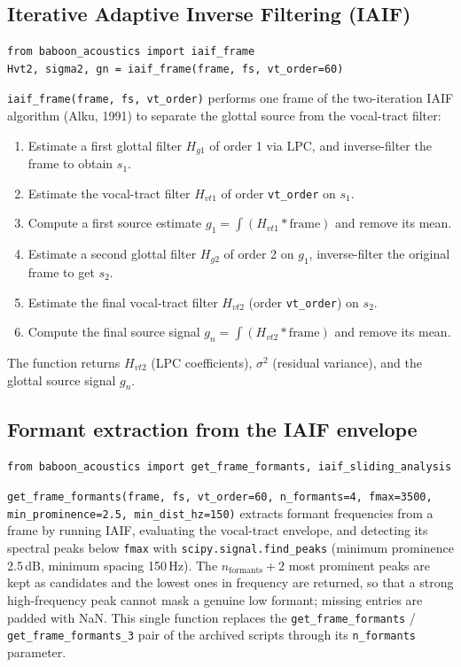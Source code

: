 \documentclass[11pt,a4paper]{article}
\newcommand{\file}[1]{\texttt{#1}}
\begin{document}
\subsection{Iterative Adaptive Inverse Filtering (IAIF)}

\begin{lstlisting}
from baboon_acoustics import iaif_frame
Hvt2, sigma2, gn = iaif_frame(frame, fs, vt_order=60)
\end{lstlisting}
\file{iaif\_frame(frame, fs, vt\_order)} performs one frame of the
two-iteration IAIF algorithm (Alku, 1991) to separate the glottal source
from the vocal-tract filter:
\begin{enumerate}
\item Estimate a first glottal filter $H_{g1}$ of order 1 via LPC, and
      inverse-filter the frame to obtain $s_1$.
\item Estimate the vocal-tract filter $H_{vt1}$ of order
      \file{vt\_order} on $s_1$.
\item Compute a first source estimate
      $g_1 = \int (H_{vt1} * \text{frame})$ and remove its mean.
\item Estimate a second glottal filter $H_{g2}$ of order 2 on $g_1$,
      inverse-filter the original frame to get $s_2$.
\item Estimate the final vocal-tract filter $H_{vt2}$ (order
      \file{vt\_order}) on $s_2$.
\item Compute the final source signal
      $g_n = \int (H_{vt2} * \text{frame})$ and remove its mean.
\end{enumerate}
The function returns $H_{vt2}$ (LPC coefficients), $\sigma^2$ (residual
variance), and the glottal source signal $g_n$.

\subsection{Formant extraction from the IAIF envelope}

\begin{lstlisting}
from baboon_acoustics import get_frame_formants, iaif_sliding_analysis
\end{lstlisting}
\file{get\_frame\_formants(frame, fs, vt\_order=60, n\_formants=4,
fmax=3500, min\_prominence=2.5, min\_dist\_hz=150)} extracts formant
frequencies from a frame by running IAIF, evaluating the vocal-tract
envelope, and detecting its spectral peaks below \file{fmax} with
\file{scipy.signal.find\_peaks} (minimum prominence 2.5\,dB, minimum
spacing 150\,Hz). The $n_{\mathrm{formants}} + 2$ most prominent peaks
are kept as candidates and the lowest ones in frequency are returned, so
that a strong high-frequency peak cannot mask a genuine low formant;
missing entries are padded with NaN. This single function replaces the
\file{get\_frame\_formants} / \file{get\_frame\_formants\_3} pair of the
archived scripts through its \file{n\_formants} parameter.
\end{document}
